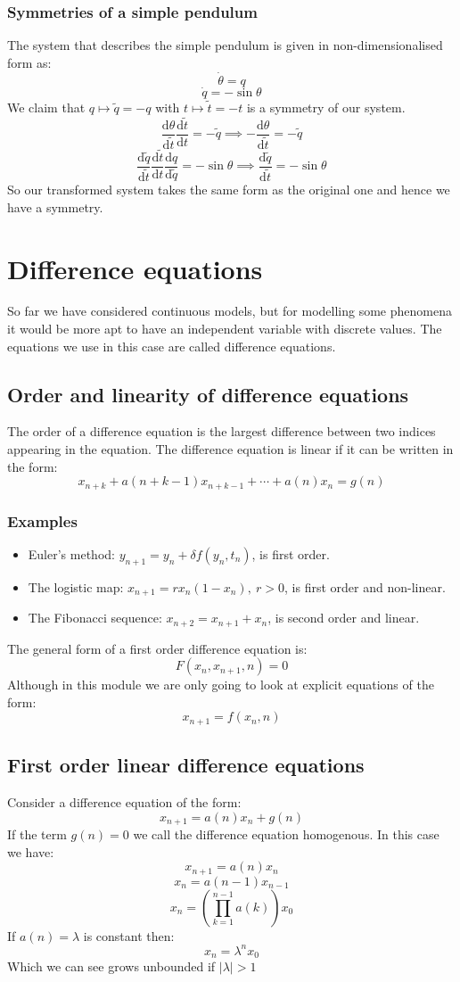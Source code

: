 \documentclass[12pt]{article}
\newcommand{\df}[2]{\frac{\text{d}#1}{\text{d}#2}}
\begin{document}
\subsubsection*{Symmetries of a simple pendulum}
The system that describes the simple pendulum is given in non-dimensionalised form as:
\[\dot{\theta}=q\]
\[\dot{q}=-\sin\theta\]
We claim that \(q\mapsto\tilde{q}=-q\) with \(t\mapsto\tilde{t}=-t\) is a symmetry of our system.
\[\df{\theta}{\tilde{t}}\df{\tilde{t}}{t}=-\tilde{q}\implies -\df{\theta}{\tilde{t}}=-\tilde{q}\]
\[\df{\tilde{q}}{\tilde{t}}\df{\tilde{t}}{t}\df{q}{\tilde{q}}=-\sin\theta\implies\df{\tilde{q}}{\tilde{t}}=-\sin\theta\]
So our transformed system takes the same form as the original one and hence we have a symmetry. 
\section{Difference equations}
So far we have considered continuous models, but for modelling some phenomena it would be more apt to have an independent variable with discrete values. The equations we use in this case are called difference equations.
\subsection*{Order and linearity of difference equations}
The order of a difference equation is the largest difference between two indices appearing in the equation. The difference equation is linear if it can be written in the form:
\[x_{n+k}+a(n+k-1)x_{n+k-1}+\cdots+a(n)x_n=g(n)\]
\subsubsection*{Examples}
\begin{itemize}
    \item Euler's method: \(y_{n+1}=y_n+\delta f(y_n,t_n)\), is first order.
    \item The logistic map: \(x_{n+1}=rx_n(1-x_n),\ r>0\), is first order and non-linear.
    \item The Fibonacci sequence: \(x_{n+2}=x_{n+1}+x_{n}\), is second order and linear.
\end{itemize}
The general form of a first order difference equation is:
\[F(x_n,x_{n+1},n)=0\]
Although in this module we are only going to look at explicit equations of the form:
\[x_{n+1}=f(x_n,n)\]
\subsection*{First order linear difference equations}
Consider a difference equation of the form:
\[x_{n+1}=a(n)x_n+g(n)\]
If the term \(g(n)=0\) we call the difference equation homogenous. In this case we have:
\[x_{n+1}=a(n)x_n\]
\[x_n=a(n-1)x_{n-1}\]
\[x_n=\left(\prod^{n-1}_{k=1}a(k)\right)x_0\]
If \(a(n)=\lambda\) is constant then:
\[x_n=\lambda^nx_0\]
Which we can see grows unbounded if \(|\lambda|>1\)
\end{document}
